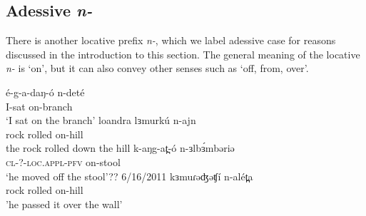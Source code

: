 

\subsection{Adessive \textit{n-}}

There is another locative prefix \textit{n-}, which we label adessive case for reasons discussed in the introduction to this section. The general meaning of the locative \textit{n-} is `on’, but it can also convey other senses such as `off, from, over’.  

\ea 
	\ea \gll é-g-a-daŋ-ó n-deté		\\	
			I-sat on-branch\\
		\glt `I sat on the branch'	
	\ex \gll loandra lɜmurkú n-ajn		 \\
			rock rolled on-hill\\
		\glt the rock rolled down the hill
	\ex \gll k-aŋg-at̪-ó n-ɜlbɜ́mbəriə	\\	
			\textsc{cl}-?-\textsc{loc.appl}-\textsc{pfv} on-stool\\
	\glt 	`he moved off the stool'??	6/16/2011 %
	\ex		kɜmuɾəʤəʧí n-alét̪a	\\
			rock rolled on-hill\\
			'he passed it over the wall'
	\z
\z 

